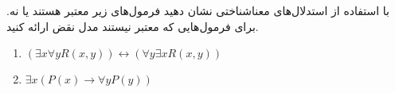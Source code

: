 با استفاده از استدلال‌های معناشناختی نشان دهید فرمول‌های زیر معتبر هستند یا نه. برای فرمول‌هایی که معتبر نیستند مدل نقض ارائه کنید.
\begin{enumerate}
\item
$(\exists x\forall y R(x,y))\leftrightarrow(\forall y \exists x R(x,y))$
\item
$\exists x(P(x)\to \forall y P(y))$
\end{enumerate}
